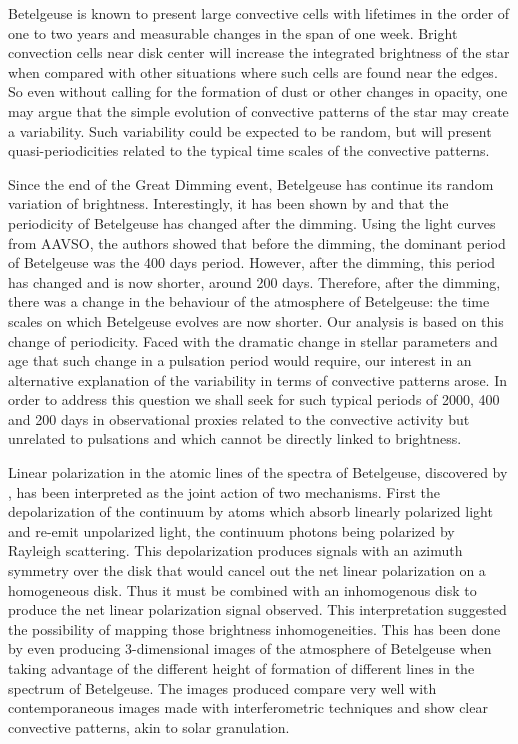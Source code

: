 \documentclass{aa}
\begin{document}
Betelgeuse is known to present large convective cells with lifetimes in the order of one to two years and measurable changes 
in the span of one week. Bright convection cells near disk center will increase the integrated brightness of the star when 
compared with other situations where such cells are found near the edges. So even without calling for the formation of 
dust or other changes in opacity, one may argue that the simple evolution of convective patterns of the star may create a variability. Such 
variability could be expected to be random, but will present quasi-periodicities related to the typical time scales of the 
convective patterns. 

Since the end of the Great Dimming event, Betelgeuse has continue its random variation of brightness. 
Interestingly, 
it has been shown by \cite{jadlovsky_analysis_2023} and \cite{dupree_great_2022} that the periodicity of Betelgeuse has changed after the dimming. Using the light curves from AAVSO, 
the authors showed that before the dimming, the dominant period of Betelgeuse was the 400 days period. However, after the dimming, this period has changed and 
is now shorter, around 200 days. Therefore, after the dimming, there was a change in the behaviour of the atmosphere of Betelgeuse: the time scales on which Betelgeuse evolves are now shorter. Our analysis is based on this change of periodicity. 
Faced with the dramatic change in stellar parameters and age that such change in a pulsation period would 
require, our interest in an alternative explanation of the variability
in terms  of convective patterns arose. In order to address this question we shall seek for such typical periods of 2000, 400 and 200 days in  
observational proxies related to the convective activity but unrelated to pulsations and which cannot be directly linked to brightness.

Linear polarization in the atomic lines of the spectra of Betelgeuse, discovered by \cite{auriere_discovery_2016}, has been interpreted as the joint action of 
two mechanisms. First the depolarization of the continuum by atoms which absorb linearly polarized light and re-emit unpolarized light, the 
continuum photons being polarized by Rayleigh scattering. This depolarization produces signals with an azimuth symmetry over the disk that 
would  cancel out the net linear polarization on a homogeneous disk. Thus it must be combined with an inhomogenous disk to produce the net linear polarization 
signal observed. This interpretation suggested the possibility of mapping those brightness inhomogeneities. This has been done by \cite{lopez_ariste_convective_2018} 
even producing 3-dimensional images of the atmosphere of Betelgeuse \citep{lopez_ariste_three-dimensional_2022} when taking advantage of the different height of formation of 
different lines in the spectrum of Betelgeuse. The images produced compare very well with contemporaneous images made with interferometric 
techniques \citep{montarges_close_2016} and show clear convective patterns, akin to solar granulation.
\end{document}
